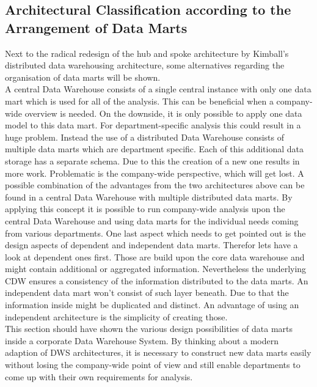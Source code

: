 \subsection{Architectural Classification according to the Arrangement of Data Marts}
Next to the radical redesign of the hub and spoke architecture by Kimball's distributed data warehousing architecture, some alternatives regarding the organisation of data marts will be shown.\newline
\\
A central Data Warehouse consists of a single central instance with only one data mart which is used for all of the analysis. This can be beneficial when a company-wide overview is needed. On the downside, it is only possible to apply one data model to this data mart. For department-specific analysis this could result in a huge problem. \newline
Instead the use of a distributed Data Warehouse consists of multiple data marts which are department specific. Each of this additional data storage has a separate schema. Due to this the creation of a new one results in more work. Problematic is the company-wide perspective, which will get lost. \newline
A possible combination of the advantages from the two architectures above can be found in a central Data Warehouse with multiple distributed data marts. By applying this concept it is possible to run company-wide analysis upon the central Data Warehouse and using data marts for the individual needs coming from various departments.
\newline
One last aspect which needs to get pointed out is the design aspects of dependent and independent data marts. Therefor lets have a look at dependent ones first. Those are build upon the core data warehouse and might contain additional or aggregated information. Nevertheless the underlying CDW ensures a consistency of the information distributed to the data marts. An independent data mart won't consist of such layer beneath. Due to that the information inside might be duplicated and distinct. An advantage of using an independent architecture is the simplicity of creating those. \cite{scriptRasch} \newline
\\
This section should have shown the various design possibilities of data marts inside a corporate Data Warehouse System. By thinking about a modern adaption of DWS architectures, it is necessary to construct new data marts easily without losing the company-wide point of view and still enable departments to come up with their own requirements for analysis. 

